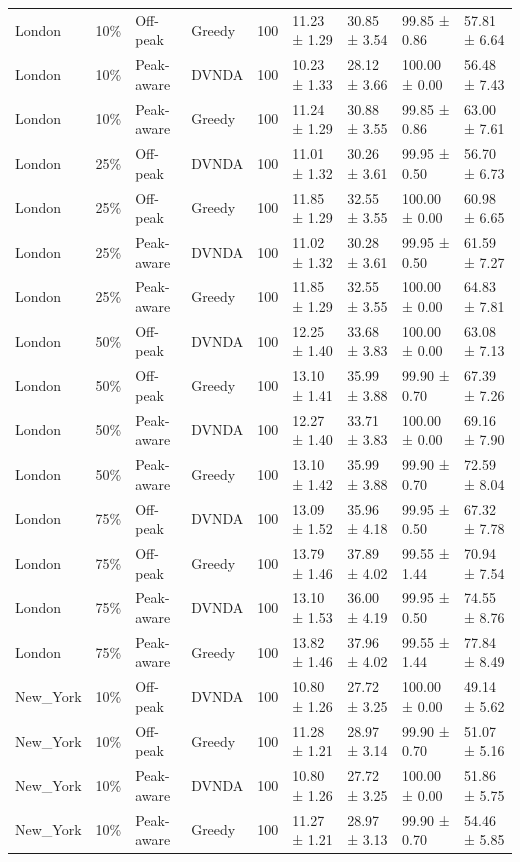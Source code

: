 \begin{tabular}{lllllllll}
London & 10\% & Off-peak & Greedy & 100 & 11.23 ± 1.29 & 30.85 ± 3.54 & 99.85 ± 0.86 & 57.81 ± 6.64 \\
London & 10\% & Peak-aware & DVNDA & 100 & 10.23 ± 1.33 & 28.12 ± 3.66 & 100.00 ± 0.00 & 56.48 ± 7.43 \\
London & 10\% & Peak-aware & Greedy & 100 & 11.24 ± 1.29 & 30.88 ± 3.55 & 99.85 ± 0.86 & 63.00 ± 7.61 \\
London & 25\% & Off-peak & DVNDA & 100 & 11.01 ± 1.32 & 30.26 ± 3.61 & 99.95 ± 0.50 & 56.70 ± 6.73 \\
London & 25\% & Off-peak & Greedy & 100 & 11.85 ± 1.29 & 32.55 ± 3.55 & 100.00 ± 0.00 & 60.98 ± 6.65 \\
London & 25\% & Peak-aware & DVNDA & 100 & 11.02 ± 1.32 & 30.28 ± 3.61 & 99.95 ± 0.50 & 61.59 ± 7.27 \\
London & 25\% & Peak-aware & Greedy & 100 & 11.85 ± 1.29 & 32.55 ± 3.55 & 100.00 ± 0.00 & 64.83 ± 7.81 \\
London & 50\% & Off-peak & DVNDA & 100 & 12.25 ± 1.40 & 33.68 ± 3.83 & 100.00 ± 0.00 & 63.08 ± 7.13 \\
London & 50\% & Off-peak & Greedy & 100 & 13.10 ± 1.41 & 35.99 ± 3.88 & 99.90 ± 0.70 & 67.39 ± 7.26 \\
London & 50\% & Peak-aware & DVNDA & 100 & 12.27 ± 1.40 & 33.71 ± 3.83 & 100.00 ± 0.00 & 69.16 ± 7.90 \\
London & 50\% & Peak-aware & Greedy & 100 & 13.10 ± 1.42 & 35.99 ± 3.88 & 99.90 ± 0.70 & 72.59 ± 8.04 \\
London & 75\% & Off-peak & DVNDA & 100 & 13.09 ± 1.52 & 35.96 ± 4.18 & 99.95 ± 0.50 & 67.32 ± 7.78 \\
London & 75\% & Off-peak & Greedy & 100 & 13.79 ± 1.46 & 37.89 ± 4.02 & 99.55 ± 1.44 & 70.94 ± 7.54 \\
London & 75\% & Peak-aware & DVNDA & 100 & 13.10 ± 1.53 & 36.00 ± 4.19 & 99.95 ± 0.50 & 74.55 ± 8.76 \\
London & 75\% & Peak-aware & Greedy & 100 & 13.82 ± 1.46 & 37.96 ± 4.02 & 99.55 ± 1.44 & 77.84 ± 8.49 \\
New\_York & 10\% & Off-peak & DVNDA & 100 & 10.80 ± 1.26 & 27.72 ± 3.25 & 100.00 ± 0.00 & 49.14 ± 5.62 \\
New\_York & 10\% & Off-peak & Greedy & 100 & 11.28 ± 1.21 & 28.97 ± 3.14 & 99.90 ± 0.70 & 51.07 ± 5.16 \\
New\_York & 10\% & Peak-aware & DVNDA & 100 & 10.80 ± 1.26 & 27.72 ± 3.25 & 100.00 ± 0.00 & 51.86 ± 5.75 \\
New\_York & 10\% & Peak-aware & Greedy & 100 & 11.27 ± 1.21 & 28.97 ± 3.13 & 99.90 ± 0.70 & 54.46 ± 5.85 \\

\end{tabular}
